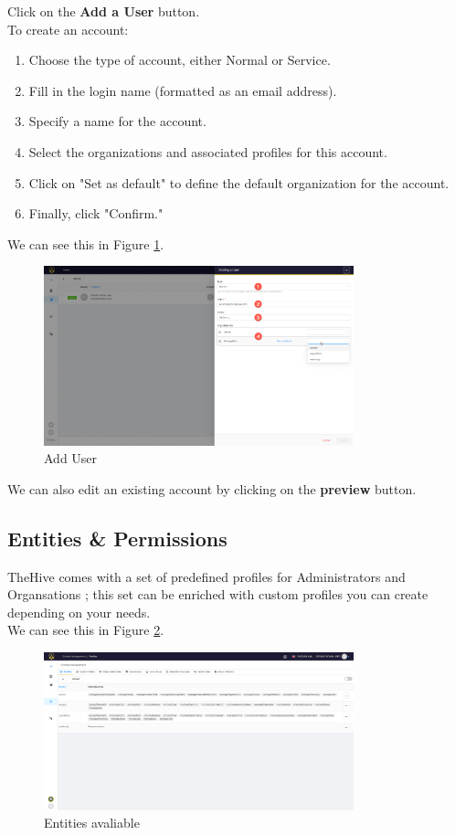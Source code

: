 \documentclass{article}
\begin{document}
Click on the \textbf{Add a User} button. \\
To create an account:

\begin{enumerate}
  \item Choose the type of account, either Normal or Service.
  \item Fill in the login name (formatted as an email address).
  \item Specify a name for the account.
  \item Select the organizations and associated profiles for this account.
  \item Click on "Set as default" to define the default organization for the account.
  \item Finally, click "Confirm."
\end{enumerate}

We can see this in Figure \ref{fig:add}.
\begin{figure}[h!]
    \centering
    \includegraphics[width=0.8\textwidth]{accounts2.png}
    \caption{Add User}
    \label{fig:add}
\end{figure}

We can also edit an existing account by clicking on the \textbf{preview} button. \\

\subsection{Entities \& Permissions}
TheHive comes with a set of predefined profiles for Administrators and Organsations ; this set can be enriched with custom profiles you can create depending on your needs.\\
We can see this in Figure \ref{fig:entities}.
\begin{figure}[H]
    \centering
    \includegraphics[width=0.8\textwidth]{entities.png}
    \caption{Entities avaliable}
    \label{fig:entities}
\end{figure}
\end{document}
